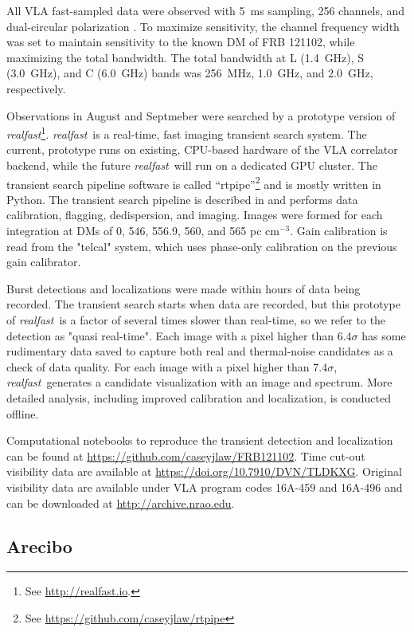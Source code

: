 \documentclass{emulateapj}
\newcommand{\rf}{\emph{realfast}}
\newcommand{\frb}{FRB 121102}
\begin{document}
All VLA fast-sampled data were observed with 5~ms sampling, 256 channels, and dual-circular polarization \citep[as in]{2015ApJ...807...16L}. To maximize sensitivity, the channel frequency width was set to maintain sensitivity to the known DM of \frb, while maximizing the total bandwidth. The total bandwidth at L (1.4~GHz), S (3.0~GHz), and C (6.0~GHz) bands was 256~MHz, 1.0~GHz, and 2.0~GHz, respectively.

Observations in August and Septmeber were searched by a prototype version of \rf\footnote{See \url{http://realfast.io}.}. \rf\ is a real-time, fast imaging transient search system. The current, prototype runs on existing, CPU-based hardware of the VLA correlator backend, while the future \rf\ will run on a dedicated GPU cluster. The transient search pipeline software is called ``rtpipe''\footnote{See \url{https://github.com/caseyjlaw/rtpipe}} and is mostly written in Python. The transient search pipeline is described in \citet{2015ApJ...807...16L} and performs data calibration, flagging, dedispersion, and imaging. Images were formed for each integration at DMs of 0, 546, 556.9, 560, and 565 pc cm$^{-3}$. Gain calibration is read from the "telcal" system, which uses phase-only calibration on the previous gain calibrator.

Burst detections and localizations were made within hours of data being recorded. The transient search starts when data are recorded, but this prototype of \rf\ is a factor of several times slower than real-time, so we refer to the detection as "quasi real-time". Each image with a pixel higher than 6.4$\sigma$ has some rudimentary data saved to capture both real and thermal-noise candidates as a check of data quality. For each image with a pixel higher than 7.4$\sigma$, \rf\ generates a candidate visualization with an image and spectrum. More detailed analysis, including improved calibration and localization, is conducted offline. 

Computational notebooks to reproduce the transient detection and localization can be found at \url{https://github.com/caseyjlaw/FRB121102}. Time cut-out visibility data are available at \url{https://doi.org/10.7910/DVN/TLDKXG}. Original visibility data are available under VLA program codes 16A-459 and 16A-496 and can be downloaded at \url{http://archive.nrao.edu}.

\subsection{Arecibo}
\end{document}

